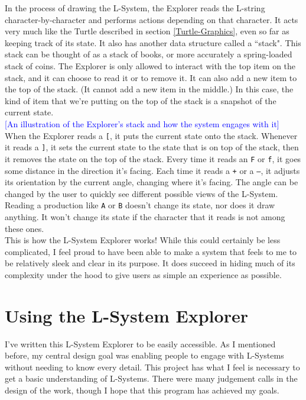 \documentclass[12pt,twoside]{reedthesis}
\newcommand{\code}[1]{\texttt{#1}}
\begin{document}
	In the process of drawing the L-System, the Explorer reads the L-string character-by-character and performs actions depending on that character. It acts very much like the Turtle described in section \ref{Turtle-Graphics}, even so far as keeping track of its state. It also has another data structure called a ``stack". This stack can be thought of as a stack of books, or more accurately a spring-loaded stack of coins. The Explorer is only allowed to interact with the top item on the stack, and it can choose to read it or to remove it. It can also add a new item to the top of the stack. (It cannot add a new item in the middle.) In this case, the kind of item that we're putting on the top of the stack is a snapshot of the current state.\\
	
	\textcolor{blue}{[An illustration of the Explorer's stack and how the system engages with it]}\\
	
	When the Explorer reads a \code{[}, it puts the current state onto the stack. Whenever it reads a \code{]}, it sets the current state to the state that is on top of the stack, then it removes the state on the top of the stack. Every time it reads an \code{F} or \code{f}, it goes some distance in the direction it's facing. Each time it reads a \code{+} or a \code{–}, it adjusts its orientation by the current angle, changing where it's facing. The angle can be changed by the user to quickly see different possible views of the L-System. Reading a production like \code{A} or \code{B} doesn't change its state, nor does it draw anything. It won't change its state if the character that it reads is not among these ones.\\
	
	This is how the L-System Explorer works! While this could certainly be less complicated, I feel proud to have been able to make a system that feels to me to be relatively sleek and clear in its purpose. It does succeed in hiding much of its complexity under the hood to give users as simple an experience as possible.\\

\section{Using the L-System Explorer}
\label{Using-the-L-System-Explorer}

	I've written this L-System Explorer to be easily accessible. As I mentioned before, my central design goal was enabling people to engage with L-Systems without needing to know every detail. This project has what I feel is necessary to get a basic understanding of L-Systems. There were many judgement calls in the design of the work, though I hope that this program has achieved my goals.\\
	
\end{document}
